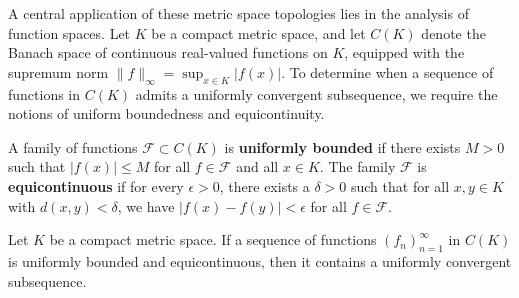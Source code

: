 A central application of these metric space topologies lies in the analysis of function spaces. Let $K$ be a compact metric space, and let $C(K)$ denote the Banach space of continuous real-valued functions on $K$, equipped with the supremum norm $\|f\|_\infty = \sup_{x \in K} |f(x)|$. To determine when a sequence of functions in $C(K)$ admits a uniformly convergent subsequence, we require the notions of uniform boundedness and equicontinuity.

\begin{definition}
A family of functions $\mathcal{F} \subset C(K)$ is \textbf{uniformly bounded} if there exists $M > 0$ such that $|f(x)| \le M$ for all $f \in \mathcal{F}$ and all $x \in K$. 
The family $\mathcal{F}$ is \textbf{equicontinuous} if for every $\epsilon > 0$, there exists a $\delta > 0$ such that for all $x, y \in K$ with $d(x, y) < \delta$, we have $|f(x) - f(y)| < \epsilon$ for all $f \in \mathcal{F}$.
\end{definition}

\begin{theorem}
Let $K$ be a compact metric space. If a sequence of functions $(f_n)_{n=1}^\infty$ in $C(K)$ is uniformly bounded and equicontinuous, then it contains a uniformly convergent subsequence.
\end{theorem}

